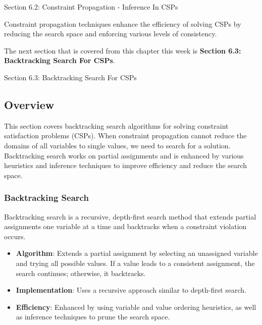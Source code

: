 \begin{notes}{Section 6.2: Constraint Propagation - Inference In CSPs}
\begin{highlight}
        Constraint propagation techniques enhance the efficiency of solving CSPs by reducing the search space and enforcing various levels of consistency.
    
    \end{highlight}
\end{notes}

The next section that is covered from this chapter this week is \textbf{Section 6.3: Backtracking Search For CSPs}.

\begin{notes}{Section 6.3: Backtracking Search For CSPs}
    \subsection*{Overview}

    This section covers backtracking search algorithms for solving constraint satisfaction problems (CSPs). When constraint propagation cannot reduce the domains of all variables to single values, we 
    need to search for a solution. Backtracking search works on partial assignments and is enhanced by various heuristics and inference techniques to improve efficiency and reduce the search space.
    
    \subsubsection*{Backtracking Search}
    
    Backtracking search is a recursive, depth-first search method that extends partial assignments one variable at a time and backtracks when a constraint violation occurs.
    
    \begin{highlight}
    
        \begin{itemize}
            \item \textbf{Algorithm}: Extends a partial assignment by selecting an unassigned variable and trying all possible values. If a value leads to a consistent assignment, the search continues; 
            otherwise, it backtracks.
            \item \textbf{Implementation}: Uses a recursive approach similar to depth-first search.
            \item \textbf{Efficiency}: Enhanced by using variable and value ordering heuristics, as well as inference techniques to prune the search space.
        \end{itemize}


\end{highlight}
\end{notes}
